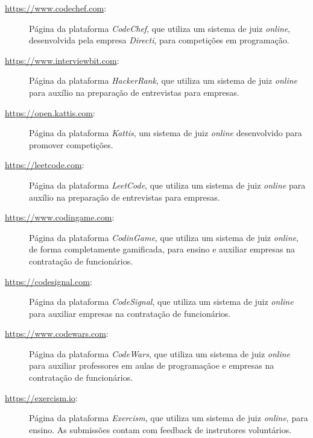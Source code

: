\begin{description}
\label{link:code_chef}
  \item[\url{https://www.codechef.com}:]  Página da plataforma \emph{CodeChef}, 
    que utiliza um sistema de juiz \emph{online}, desenvolvida pela empresa \emph{Directi},
    para competições em programação.

\label{link:interview_bit}
  \item[\url{https://www.interviewbit.com}:]  Página da plataforma \emph{HackerRank}, 
    que utiliza um sistema de juiz \emph{online} para auxílio na preparação de entrevistas
    para empresas.

\label{link:kattis}
  \item[\url{https://open.kattis.com}:] Página da plataforma \emph{Kattis}, um sistema
    de juiz \emph{online} desenvolvido para promover competições.

    \label{link:leet_code}
  \item[\url{https://leetcode.com}:]  Página da plataforma \emph{LeetCode}, 
    que utiliza um sistema de juiz \emph{online} para auxílio na preparação de entrevistas
    para empresas.

    \label{link:codin_game}
  \item[\url{https://www.codingame.com}:]  Página da plataforma \emph{CodinGame}, 
    que utiliza um sistema de juiz \emph{online}, de forma completamente gamificada,
    para ensino e auxiliar empresas na contratação de funcionários.

    \label{link:code_signal}
  \item[\url{https://codesignal.com}:]  Página da plataforma \emph{CodeSignal}, 
    que utiliza um sistema de juiz \emph{online} para auxiliar empresas 
    na contratação de funcionários.

    \label{link:code_wars}
  \item[\url{https://www.codewars.com}:]  Página da plataforma \emph{CodeWars}, 
    que utiliza um sistema de juiz \emph{online} para auxiliar professores em aulas 
    de programaçãoe e empresas na contratação de funcionários.

    \label{link:exercism}
  \item[\url{https://exercism.io}:]  Página da plataforma \emph{Exercism}, 
    que utiliza um sistema de juiz \emph{online}, para ensino. As submissões
    contam com feedback de instrutores voluntários.


\end{description}
